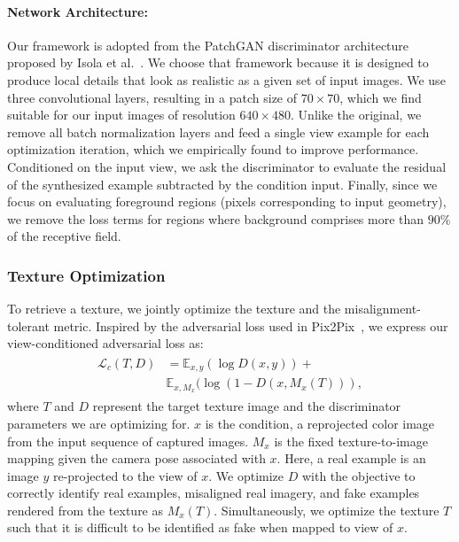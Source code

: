 \paragraph{Network Architecture:}
%
Our framework is adopted from the PatchGAN discriminator architecture proposed by Isola et al.~\cite{isola2017image}.  We choose that framework because it is designed to produce local details that look as realistic as a given set of input images.
%
We use three convolutional layers, resulting in a patch size of $70\times 70$, which we find suitable for our input images of resolution $640\times 480$.
%
Unlike the original, we remove all batch normalization layers and feed a single view example for each optimization iteration, which we empirically found to improve performance.
%
Conditioned on the input view, we ask the discriminator to evaluate the residual of the synthesized example subtracted by the condition input.
%
Finally, since we focus on evaluating foreground regions (pixels corresponding to input geometry), we remove the loss terms for regions where background comprises more than $90\%$ of the receptive field.
%

\subsubsection{Texture Optimization}%

%
To retrieve a texture, we jointly optimize the texture and the misalignment-tolerant metric.
%
Inspired by the adversarial loss used in Pix2Pix~\cite{isola2017image}, we express our view-conditioned adversarial loss as:
\begin{align}
\begin{split}
    \mathcal{L}_c(T,D) &= \mathbb{E}_{x,y}(\log D(x,y)) +\\ &\mathbb{E}_{x,M_x}(\log (1 - D(x, M_x(T) ) ),
\end{split}
\end{align}
where $T$ and $D$ represent the target texture image and the discriminator parameters we are optimizing for.
%
$x$ is the condition, a reprojected color image from the input sequence of captured images.
%
$M_x$ is the fixed texture-to-image mapping given the camera pose associated with $x$. 
%
Here, a real example is an image $y$ re-projected to the view of $x$.
%
We optimize $D$ with the objective to correctly identify real examples, misaligned real imagery, and fake examples rendered from the texture as $M_x(T)$. 
%
Simultaneously, we optimize the texture $T$ such that it is difficult to be identified as fake when mapped to view of $x$.
%

